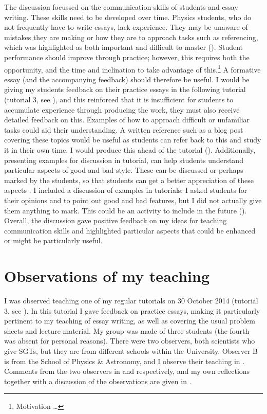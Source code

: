 The discussion focussed on the communication skills of students and essay writing. These skills need to be developed over time. Physics students, who do not frequently have to write essays, lack experience. They may be unaware of mistakes they are making or how they are to approach tasks such as referencing, which was highlighted as both important and difficult to master (). Student performance should improve through practice; however, this requires both the opportunity, and the time and inclination to take advantage of this.\footnote{Motivation \ldots} A formative essay (and the accompanying feedback) should therefore be useful. I would be giving my students feedback on their practice essays in the following tutorial (tutorial 3, see ), and this reinforced that it is insufficient for students to accumulate experience through producing the work, they must also receive detailed feedback on this. Examples of how to approach difficult or unfamiliar tasks could aid their understanding. A written reference such as a blog post covering these topics would be useful as students can refer back to this and study it in their own time. I would produce this ahead of the tutorial (). Additionally, presenting examples for discussion in tutorial, can help students understand particular aspects of good and bad style. These can be discussed or perhaps marked by the students, so that students can get a better appreciation of these aspects \citep[chapter 10]{Ramsden1992}. I included a discussion of examples in tutorials; I asked students for their opinions and to point out good and bad features, but I did not actually give them anything to mark. This could be an activity to include in the future (). Overall, the discussion gave positive feedback on my ideas for teaching communication skills and highlighted particular aspects that could be enhanced or might be particularly useful.


\section{Observations of my teaching}\label{sec:me}

I was observed teaching one of my regular tutorials on 30 October 2014 (tutorial 3, see ). In this tutorial I gave feedback on practice essays, making it particularly pertinent to my teaching of essay writing, as well as covering the usual problem sheets and lecture material. My group was made of three students (the fourth was absent for personal reasons). There were two observers, both scientists who give SGTs, but they are from different schools within the University. Observer B is from the School of Physics \& Astronomy, and I observe their teaching in . Comments from the two observers in  and  respectively, and my own reflections together with a discussion of the observations are given in .

